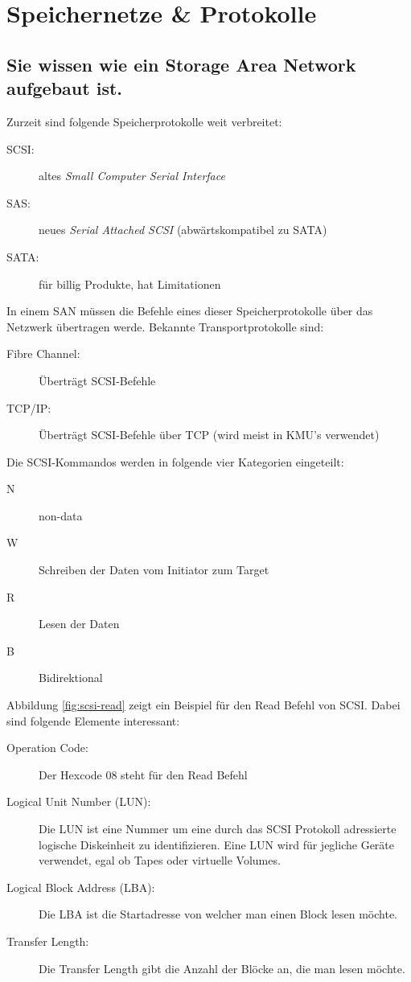 \section{Speichernetze \& Protokolle}

\subsection{Sie wissen wie ein Storage Area Network aufgebaut ist.}

Zurzeit sind folgende Speicherprotokolle weit verbreitet:
\begin{description}
	\item[SCSI:] altes \emph{Small Computer Serial Interface}
	\item[SAS:] neues \emph{Serial Attached SCSI} (abwärtskompatibel zu SATA)
	\item[SATA:] für billig Produkte, hat Limitationen
\end{description}
In einem SAN müssen die Befehle eines dieser Speicherprotokolle über das Netzwerk übertragen werde. Bekannte Transportprotokolle sind:
\begin{description}
	\item[Fibre Channel:] Überträgt SCSI-Befehle
	\item[TCP/IP:] Überträgt SCSI-Befehle über TCP (wird meist in KMU's verwendet)
\end{description}
Die SCSI-Kommandos werden in folgende vier Kategorien eingeteilt:
\begin{description}
	\item[N] non-data
	\item[W] Schreiben der Daten vom Initiator zum Target
	\item[R] Lesen der Daten
	\item[B] Bidirektional
\end{description}
Abbildung \ref{fig:scsi-read} zeigt ein Beispiel für den Read Befehl von SCSI. Dabei sind folgende Elemente interessant:
\begin{description}
	\item[Operation Code:] Der Hexcode 08 steht für den Read Befehl
	\item[Logical Unit Number (LUN):] Die LUN ist eine Nummer um eine durch das SCSI Protokoll adressierte logische Diskeinheit zu identifizieren. Eine LUN wird für jegliche Geräte verwendet, egal ob Tapes oder virtuelle Volumes.
	\item[Logical Block Address (LBA):] Die LBA ist die Startadresse von welcher man einen Block lesen möchte.
	\item[Transfer Length:] Die Transfer Length gibt die Anzahl der Blöcke an, die man lesen möchte.
\end{description}


